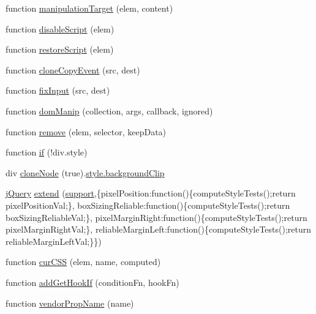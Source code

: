 \begin{DoxyCompactItemize}
\item 
function \hyperlink{jquery-3_82_81_8js_ac068a7c75fbadde5f474671ecedf4c66}{manipulation\+Target} (elem, content)
\item 
function \hyperlink{jquery-3_82_81_8js_a7e16d3514c9c5be87f4385e19959ebb0}{disable\+Script} (elem)
\item 
function \hyperlink{jquery-3_82_81_8js_a548c5e10ccd9bac9e45d283a9c5905df}{restore\+Script} (elem)
\item 
function \hyperlink{jquery-3_82_81_8js_affdf2958c2651c21a623b3aa0ef5e946}{clone\+Copy\+Event} (src, dest)
\item 
function \hyperlink{jquery-3_82_81_8js_a1d6b88736e44bf1da749264e1c7fe6b4}{fix\+Input} (src, dest)
\item 
function \hyperlink{jquery-3_82_81_8js_a9e92bfdce15ff0452ab072c1d554b819}{dom\+Manip} (collection, args, callback, ignored)
\item 
function \hyperlink{jquery-3_82_81_8js_a7ddf3a7715404466a918041783666ca8}{remove} (elem, selector, keep\+Data)
\item 
function \hyperlink{jquery-3_82_81_8js_a81faa04b762aeb5cb2e7780fc4e00158}{if} (!div.\+style)
\item 
div \hyperlink{jquery-3_82_81_8js_a425684b52fb76a109f25625d7327418b}{clone\+Node} (true).\hyperlink{jquery-3_82_81_8js_adbba85353f0cf06c0afdc8063e67fbd8}{style.\+background\+Clip}
\item 
\hyperlink{jquery-3_82_81_8js_a609525712f1102566c2b03866ceb2bba}{j\+Query} \hyperlink{jquery-3_82_81_8js_a5fbe8332fa68ac0a4773c053afcad82f}{extend} (\hyperlink{jquery-3_82_81_8js_ab166c89ccabddfd7c423a7fcb23ca84f}{support},\{pixel\+Position\+:function()\{compute\+Style\+Tests();return pixel\+Position\+Val;\}, box\+Sizing\+Reliable\+:function()\{compute\+Style\+Tests();return box\+Sizing\+Reliable\+Val;\}, pixel\+Margin\+Right\+:function()\{compute\+Style\+Tests();return pixel\+Margin\+Right\+Val;\}, reliable\+Margin\+Left\+:function()\{compute\+Style\+Tests();return reliable\+Margin\+Left\+Val;\}\})
\item 
function \hyperlink{jquery-3_82_81_8js_af221546ca79f05e12098c571598177d2}{cur\+C\+SS} (elem, name, computed)
\item 
function \hyperlink{jquery-3_82_81_8js_afe1f73f86828a8cbdec452c5986d0f1e}{add\+Get\+Hook\+If} (condition\+Fn, hook\+Fn)
\item 
function \hyperlink{jquery-3_82_81_8js_aad9b10e200f56658c3a21eff6145c2fc}{vendor\+Prop\+Name} (name)
\item 

\end{DoxyCompactItemize}
